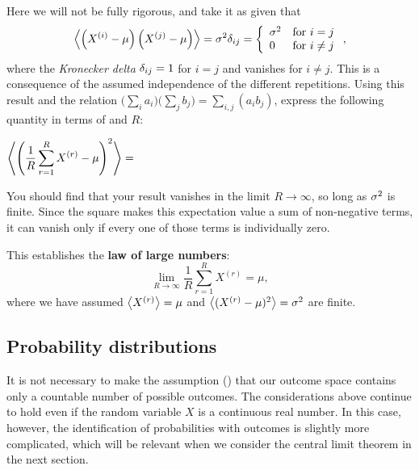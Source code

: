 Here we will not be fully rigorous, and take it as given that
\begin{equation*}
  \left\langle \left(X^{(i)} - \mu\right)\left(X^{(j)} - \mu\right) \right\rangle = \sigma^2 \delta_{ij} = \left\{\begin{array}{ll}\sigma^2 & \mbox{for } i = j \\ 0 & \mbox{for } i \ne j\end{array}\right.,
\end{equation*}
where the \textit{Kronecker delta} $\delta_{ij} = 1$ for $i = j$ and vanishes for $i \ne j$.
This is a consequence of the assumed independence of the different repetitions.
Using this result and the relation $\big(\sum_i a_i\big)\big(\sum_j b_j\big) = \sum_{i, j} \left(a_i b_j\right)$, express the following quantity in terms of \si and $R$:
\begin{mdframed}
  $\displaystyle \left\langle \left(\frac{1}{R} \sum_{r = 1}^R X^{(r)} - \mu\right)^2 \right\rangle = $ \\[100 pt] %
\end{mdframed}
You should find that your result vanishes in the limit $R \to \infty$, so long as $\sigma^2$ is finite.
Since the square makes this expectation value a sum of non-negative terms, it can vanish only if every one of those terms is individually zero.

\begin{shaded}
  This establishes the \textbf{law of large numbers}:
  \begin{equation}
    \lim_{R \to \infty} \frac{1}{R} \sum_{r = 1}^R X^{(r)} = \mu,
  \end{equation}
  where we have assumed $\left\langle X^{(r)} \right\rangle = \mu$ and $\left\langle (X^{(r)} - \mu)^2 \right\rangle = \sigma^2$ are finite.
\end{shaded}



\subsection{\label{sec:probdist}Probability distributions}
It is not necessary to make the assumption () that our outcome space contains only a countable number of possible outcomes.
The considerations above continue to hold even if the random variable $X$ is a continuous real number.
In this case, however, the identification of probabilities with outcomes is slightly more complicated, which will be relevant when we consider the central limit theorem in the next section.

